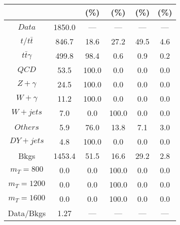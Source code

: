 \begin{figure}
\begin{minipage}[c]{0.32\textwidth}
{\begin{tabular}{cccccc}
 &  & (\%) & (\%) & (\%) & (\%)  \\
\hline
                                                                      $ Data $ &  1850.0 &  --- &  --- &  --- &  ---\\
$ t/t\bar{t} $ &  846.7 &  18.6 &  27.2 &  49.5 &  4.6\\
$ t\bar{t}\gamma $ &  499.8 &  98.4 &  0.6 &  0.9 &  0.2\\
$ QCD $ &  53.5 &  100.0 &  0.0 &  0.0 &  0.0\\
$ Z+\gamma $ &  24.5 &  100.0 &  0.0 &  0.0 &  0.0\\
$ W+\gamma $ &  11.2 &  100.0 &  0.0 &  0.0 &  0.0\\
$ W+jets $ &  7.0 &  0.0 &  100.0 &  0.0 &  0.0\\
$ Others $ &  5.9 &  76.0 &  13.8 &  7.1 &  3.0\\
$ DY+jets $ &  4.8 &  100.0 &  0.0 &  0.0 &  0.0\\
Bkgs &  1453.4 &  51.5 &  16.6 &  29.2 &  2.8\\
$ m_{T} = 800 $ &  0.0 &  0.0 &  100.0 &  0.0 &  0.0\\
$ m_{T} = 1200 $ &  0.0 &  0.0 &  100.0 &  0.0 &  0.0\\
$ m_{T} = 1600 $ &  0.0 &  0.0 &  100.0 &  0.0 &  0.0\\
Data/Bkgs &  1.27 &  --- &  --- &  --- &  ---\\
\hline
\end{tabular}
}
\end{minipage}
\end{figure}

